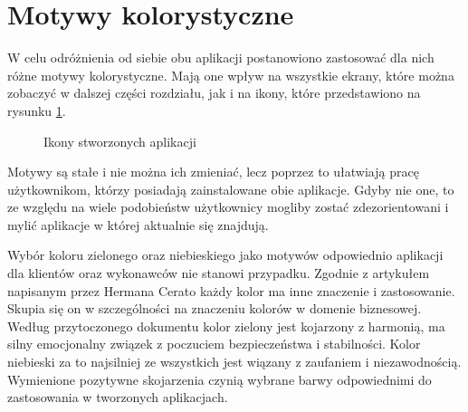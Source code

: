 \section{Motywy kolorystyczne}

W celu odróżnienia od siebie obu aplikacji postanowiono zastosować dla nich różne motywy kolorystyczne. Mają one wpływ na wszystkie ekrany, które można zobaczyć w dalszej części rozdziału, jak i na ikony, które przedstawiono na rysunku \ref{fig:icons}.

\begin{figure}[ht!]
  \centering
  \caption{Ikony stworzonych aplikacji}
  \label{fig:icons}
\end{figure}

Motywy są stałe i nie można ich zmieniać, lecz poprzez to ułatwiają pracę użytkownikom, którzy posiadają zainstalowane obie aplikacje. Gdyby nie one, to ze względu na wiele podobieństw użytkownicy mogliby zostać zdezorientowani i mylić aplikacje w której aktualnie się znajdują.

Wybór koloru zielonego oraz niebieskiego jako motywów odpowiednio aplikacji dla klientów oraz wykonawców nie stanowi przypadku. Zgodnie z artykułem napisanym przez Hermana Cerato \cite{colors-meaning} każdy kolor ma inne znaczenie i zastosowanie. Skupia się on w szczególności na znaczeniu kolorów w domenie biznesowej. Według przytoczonego dokumentu kolor zielony jest kojarzony z harmonią, ma silny emocjonalny związek z poczuciem bezpieczeństwa i stabilności. Kolor niebieski za to najsilniej ze wszystkich jest wiązany z zaufaniem i niezawodnością. Wymienione pozytywne skojarzenia czynią wybrane barwy odpowiednimi do zastosowania w tworzonych aplikacjach.